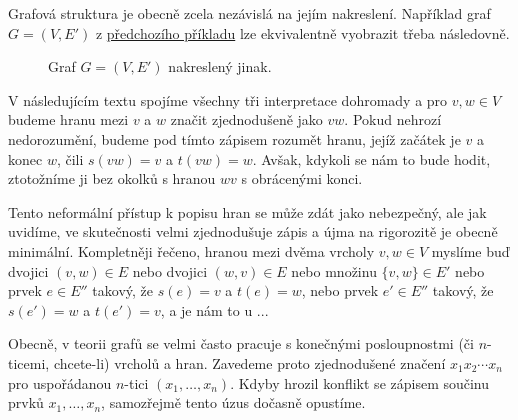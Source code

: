 \begin{warning}
 Grafová struktura je obecně zcela nezávislá na jejím nakreslení. Například graf
 $G = (V,E')$ z \hyperref[exam:interpretace-grafu]{předchozího příkladu} lze
 ekvivalentně vyobrazit třeba následovně.
 \begin{figure}[H]
  \centering
  \caption{Graf $G = (V,E')$ nakreslený jinak.}
  \label{fig:graf-podruhe}
 \end{figure}

\end{warning}

V následujícím textu spojíme všechny tři interpretace dohromady a pro $v,w \in
V$ budeme hranu mezi $v$ a $w$ značit zjednodušeně jako $vw$. Pokud nehrozí
nedorozumění, budeme pod tímto zápisem rozumět hranu, jejíž začátek je $v$ a
konec $w$, čili $s(vw) = v$ a $t(vw) = w$. Avšak, kdykoli se nám to bude hodit,
ztotožníme ji bez okolků s hranou $wv$ s obrácenými konci.

Tento neformální přístup k popisu hran se může zdát jako nebezpečný, ale jak
uvidíme, ve skutečnosti velmi zjednodušuje zápis a újma na rigorozitě je obecně
minimální. Kompletněji řečeno, hranou mezi dvěma vrcholy ${v,w \in V}$ myslíme
buď dvojici $(v,w) \in E$ nebo dvojici $(w,v) \in E$ nebo množinu $\{v,w\} \in
E'$ nebo prvek $e \in E''$ takový, že $s(e) = v$ a $t(e) = w$, nebo prvek $e'
\in E''$ takový, že $s(e') = w$ a $t(e') = v$, a je nám to u ...

Obecně, v teorii grafů se velmi často pracuje s konečnými posloupnostmi (či
$n$-ticemi, chcete-li) vrcholů a hran. Zavedeme proto zjednodušené značení
$x_1x_2\cdots x_n$ pro uspořádanou $n$-tici $(x_1,\ldots,x_n)$. Kdyby hrozil
konflikt se zápisem součinu prvků $x_1,\ldots,x_n$, samozřejmě tento úzus
dočasně opustíme.



